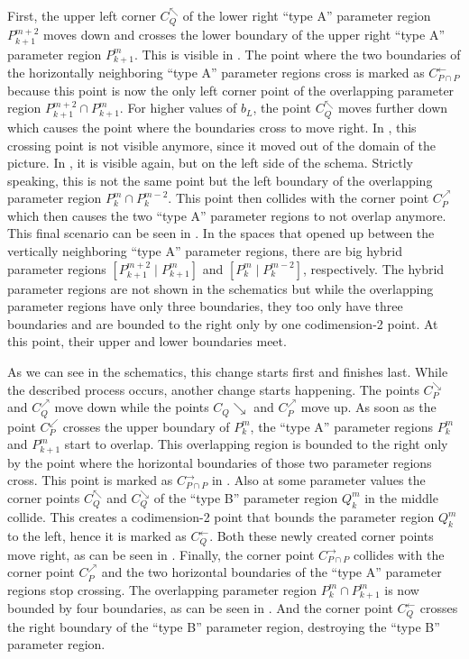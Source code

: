 First, the upper left corner $C_Q^\nwarrow$ of the lower right ``type A'' parameter region $P^{m+2}_{k+1}$ moves down and crosses the lower boundary of the upper right ``type A'' parameter region $P^m_{k+1}$.
This is visible in .
The point where the two boundaries of the horizontally neighboring ``type A'' parameter regions cross is marked as $C_{P \cap P}^\leftarrow$ because this point is now the only left corner point of the overlapping parameter region $P^{m+2}_{k+1} \cap P^{m}_{k+1}$.
For higher values of $b_L$, the point $C_Q^\nwarrow$ moves further down which causes the point where the boundaries cross to move right.
In , this crossing point is not visible anymore, since it moved out of the domain of the picture.
In , it is visible again, but on the left side of the schema.
Strictly speaking, this is not the same point but the left boundary of the overlapping parameter region $P^m_k \cap P^{m-2}_{k}$.
This point then collides with the corner point $C_P^\nearrow$ which then causes the two ``type A'' parameter regions to not overlap anymore.
This final scenario can be seen in .
In the spaces that opened up between the vertically neighboring ``type A'' parameter regions, there are big hybrid parameter regions $\left[P^{m+2}_{k+1} \mid P^{m}_{k+1}\right]$ and $\left[P^m_k \mid P^{m-2}_k\right]$, respectively.
The hybrid parameter regions are not shown in the schematics but while the overlapping parameter regions have only three boundaries, they too only have three boundaries and are bounded to the right only by one codimension-2 point.
At this point, their upper and lower boundaries meet.

As we can see in the schematics, this change starts first and finishes last.
While the described process occurs, another change starts happening.
The points $C_P^\searrow$ and $C_Q^\nearrow$ move down while the points $C_Q\searrow$ and $C_P^\nearrow$ move up.
As soon as the point $C_P^\swarrow$ crosses the upper boundary of $P^m_k$, the ``type A'' parameter regions $P^m_k$ and $P^m_{k+1}$ start to overlap.
This overlapping region is bounded to the right only by the point where the horizontal boundaries of those two parameter regions cross.
This point is marked as $C_{P \cap P}^\rightarrow$ in .
Also at some parameter values the corner points $C_Q^\nwarrow$ and $C_Q^\searrow$ of the ``type B'' parameter region $Q^m_k$ in the middle collide.
This creates a codimension-2 point that bounds the parameter region $Q^m_k$ to the left, hence it is marked as $C_Q^\leftarrow$.
Both these newly created corner points move right, as can be seen in .
Finally, the corner point $C_{P \cap P}^\rightarrow$ collides with the corner point $C_P^\nearrow$ and the two horizontal boundaries of the ``type A'' parameter regions stop crossing.
The overlapping parameter region $P^m_k \cap P^m_{k+1}$ is now bounded by four boundaries, as can be seen in .
And the corner point $C_Q^\leftarrow$ crosses the right boundary of the ``type B'' parameter region, destroying the ``type B'' parameter region.

